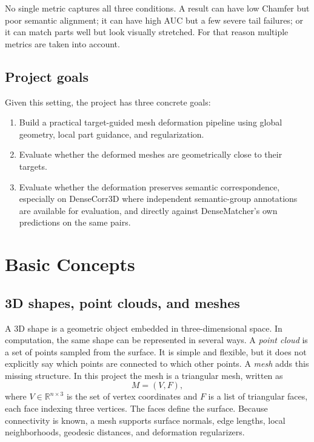 \documentclass{article}
\begin{document}
No single metric captures all three conditions. A result can have low Chamfer but poor semantic
alignment; it can have high AUC but a few severe tail failures; or it can match parts well but look
visually stretched. For that reason multiple metrics are taken into account. 

\subsection{Project goals}

Given this setting, the project has three concrete goals:

\begin{enumerate}
  \item Build a practical target-guided mesh deformation pipeline using global geometry, local
  part guidance, and regularization.
  \item Evaluate whether the deformed meshes are geometrically close to their targets.
  \item Evaluate whether the deformation preserves semantic correspondence, especially on
  DenseCorr3D where independent semantic-group annotations are available for evaluation, and
  directly against DenseMatcher's own predictions on the same pairs.
\end{enumerate}

\section{Basic Concepts}

\subsection{3D shapes, point clouds, and meshes}

A 3D shape is a geometric object embedded in three-dimensional space. In computation, the same
shape can be represented in several ways. A \emph{point cloud} is a set of points sampled from the
surface. It is simple and flexible, but it does not explicitly say which points are connected to
which other points. A \emph{mesh} adds this missing structure. In this project the mesh is a
triangular mesh, written as
\[
M = (V,F),
\]
where $V \in \mathbb{R}^{n \times 3}$ is the set of vertex coordinates and $F$ is a list of
triangular faces, each face indexing three vertices. The faces define the surface. Because
connectivity is known, a mesh supports surface normals, edge lengths, local neighborhoods,
geodesic distances, and deformation regularizers.
\end{document}
